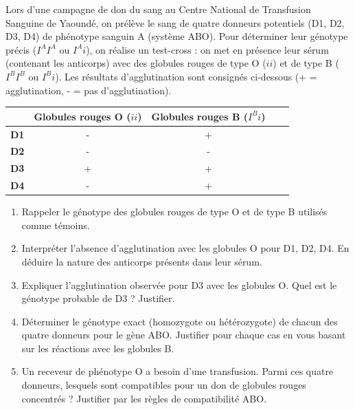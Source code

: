 \documentclass[11pt]{article}
\begin{document}
\begin{exercice}
Lors d'une campagne de don du sang au Centre National de Transfusion Sanguine de Yaoundé, on prélève le sang de quatre donneurs potentiels (D1, D2, D3, D4) de phénotype sanguin A (système ABO). Pour déterminer leur génotype précis ($I^A I^A$ ou $I^A i$), on réalise un test-cross : on met en présence leur sérum (contenant les anticorps) avec des globules rouges de type O ($ii$) et de type B ($I^B I^B$ ou $I^B i$). Les résultats d'agglutination sont consignés ci-dessous (\og + \fg = agglutination, \og - \fg = pas d'agglutination).

\begin{center}
\begin{tabular}{|c|c|c|c|c|}
\hline
& \textbf{Globules rouges O ($ii$)} & \textbf{Globules rouges B ($I^B i$)} \\ \hline
\textbf{D1} & - & + \\ \hline
\textbf{D2} & - & - \\ \hline
\textbf{D3} & + & + \\ \hline
\textbf{D4} & - & + \\ \hline
\end{tabular}
\end{center}

\begin{enumerate}
\item Rappeler le génotype des globules rouges de type O et de type B utilisés comme témoins.
\item Interpréter l'absence d'agglutination avec les globules O pour D1, D2, D4. En déduire la nature des anticorps présents dans leur sérum.
\item Expliquer l'agglutination observée pour D3 avec les globules O. Quel est le génotype probable de D3 ? Justifier.
\item Déterminer le génotype exact (homozygote ou hétérozygote) de chacun des quatre donneurs pour le gène ABO. Justifier pour chaque cas en vous basant sur les réactions avec les globules B.
\item Un receveur de phénotype O a besoin d'une transfusion. Parmi ces quatre donneurs, lesquels sont compatibles pour un don de globules rouges concentrés ? Justifier par les règles de compatibilité ABO.
\end{enumerate}
\end{exercice}
\end{document}
